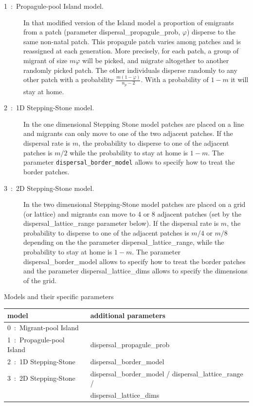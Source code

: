 \documentclass[letterpaper,12pt,oneside]{book}
\begin{document}
\begin{description}
\begin{description}
\item[1~:~Propagule-pool Island model.] In that modified version of the Island model a proportion of emigrants from a patch (parameter \textsf{dispersal\_propagule\_prob}, $\varphi$) disperse to the same non-natal patch.  This propagule patch varies among patches and is reassigned at each generation. More precisely, for each patch, a group of migrant of size $m\varphi$ will be picked, and migrate altogether to another randomly picked patch. The other individuals disperse randomly to any other patch with a probability $\frac{m(1-\varphi)}{n_{p}-2}$. With a probability of $1-m$ it will stay at home.

\item[2~:~1D Stepping-Stone model.] In the one dimensional Stepping Stone model patches are placed on a line and migrants can only move to one of the two adjacent patches. If the dispersal rate is $m$, the probability to disperse to one of the adjacent patches is $m/2$ while the probability to stay at home is $1-m$. The parameter \texttt{dispersal\_border\_model} allows to specify how to treat the border patches.   

\item[3~:~2D Stepping-Stone model.] In the two dimensional Stepping-Stone model patches are placed on a grid (or lattice) and migrants can move to 4 or 8 adjacent patches (set by the \textsf{dispersal\_lattice\_range} parameter below). If the dispersal rate is $m$, the probability to disperse to one of the adjacent patches is $m/4$ or $m/8$ depending on the the parameter \textsf{dispersal\_lattice\_range}, while the probability to stay at home is $1-m$. The parameter \textsf{dispersal\_border\_model} allows to specify how to treat the border patches and the parameter \textsf{dispersal\_lattice\_dims} allows to specify the dimensions of the grid.   

\end{description}

Models and their specific parameters\\
\begin{tabular*}{0.92\textwidth}{ll}
 \hline model & additional parameters \\ 
 \hline
 0~:~Migrant-pool Island    & \\
 1~:~Propagule-pool Island  & dispersal\_propagule\_prob\\
 2~:~1D Stepping-Stone      & dispersal\_border\_model\\
 3~:~2D Stepping-Stone      & dispersal\_border\_model / dispersal\_lattice\_range / \\
                            & dispersal\_lattice\_dims\\
 \hline
\end{tabular*}



\end{description}
\end{document}
